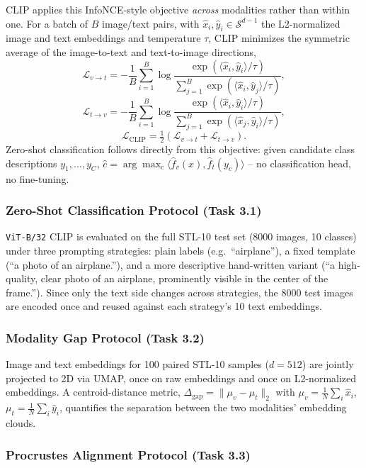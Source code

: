 CLIP applies this InfoNCE-style objective \emph{across} modalities rather
than within one. For a batch of $B$ image/text pairs, with $\hat{x}_i,
\hat{y}_i\in\mathcal{S}^{d-1}$ the L2-normalized image and text embeddings
and temperature $\tau$, CLIP minimizes the symmetric average of the
image-to-text and text-to-image directions,
\[
  \mathcal{L}_{v\to t} = -\frac{1}{B}\sum_{i=1}^B\log\frac{\exp(\langle\hat{x}_i,\hat{y}_i\rangle/\tau)}{\sum_{j=1}^B\exp(\langle\hat{x}_i,\hat{y}_j\rangle/\tau)},
\]
\[
  \mathcal{L}_{t\to v} = -\frac{1}{B}\sum_{i=1}^B\log\frac{\exp(\langle\hat{x}_i,\hat{y}_i\rangle/\tau)}{\sum_{j=1}^B\exp(\langle\hat{x}_j,\hat{y}_i\rangle/\tau)},
\]
\[
  \mathcal{L}_{\text{CLIP}} = \tfrac{1}{2}(\mathcal{L}_{v\to t}+\mathcal{L}_{t\to v}).
\]
Zero-shot classification follows directly from this objective: given
candidate class descriptions $y_1,\dots,y_C$,
$\hat{c}=\arg\max_c\langle\hat{f}_v(x),\hat{f}_t(y_c)\rangle$ -- no
classification head, no fine-tuning.

\subsubsection{Zero-Shot Classification Protocol (Task 3.1)}

\texttt{ViT-B/32} CLIP is evaluated on the full STL-10 test set (8000
images, 10 classes) under three prompting strategies: plain labels (e.g.\
``airplane''), a fixed template (``a photo of an airplane.''), and a more
descriptive hand-written variant (``a high-quality, clear photo of an
airplane, prominently visible in the center of the frame.''). Since only
the text side changes across strategies, the 8000 test images are encoded
once and reused against each strategy's 10 text embeddings.

\subsubsection{Modality Gap Protocol (Task 3.2)}

Image and text embeddings for 100 paired STL-10 samples ($d=512$) are
jointly projected to 2D via UMAP, once on raw embeddings and once on
L2-normalized embeddings. A centroid-distance metric,
$\Delta_{\text{gap}}=\|\mu_v-\mu_t\|_2$ with
$\mu_v=\frac{1}{N}\sum_i\hat{x}_i$, $\mu_t=\frac{1}{N}\sum_i\hat{y}_i$,
quantifies the separation between the two modalities' embedding clouds.

\subsubsection{Procrustes Alignment Protocol (Task 3.3)}

